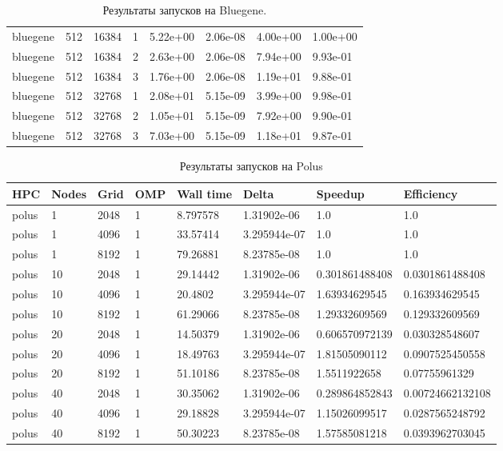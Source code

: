\documentclass[12pt,a4paper]{scrartcl}
\begin{document}
\begin{center}
\begin{table}[h]
\begin{tabular}{l|lllllll}
bluegene & 512 & 16384 & 1 & 5.22e+00 & 2.06e-08 & 4.00e+00 & 1.00e+00 \\
bluegene & 512 & 16384 & 2 & 2.63e+00 & 2.06e-08 & 7.94e+00 & 9.93e-01 \\
bluegene & 512 & 16384 & 3 & 1.76e+00 & 2.06e-08 & 1.19e+01 & 9.88e-01 \\
bluegene & 512 & 32768 & 1 & 2.08e+01 & 5.15e-09 & 3.99e+00 & 9.98e-01 \\
bluegene & 512 & 32768 & 2 & 1.05e+01 & 5.15e-09 & 7.92e+00 & 9.90e-01 \\
bluegene & 512 & 32768 & 3 & 7.03e+00 & 5.15e-09 & 1.18e+01 & 9.87e-01 \\
\hline
\end{tabular}
\caption{Результаты запусков на Bluegene.}
\end{table}
\end{center}

\newpage
      
\begin{center}
\begin{table}[h]
\begin{tabular}{l|lllllll}
\label{tabular:polus}

HPC & Nodes & Grid & OMP & Wall time & Delta & Speedup & Efficiency \\
\hline
polus & 1 & 2048 & 1 & 8.797578 & 1.31902e-06 & 1.0 & 1.0 \\
polus & 1 & 4096 & 1 & 33.57414 & 3.295944e-07 & 1.0 & 1.0 \\
polus & 1 & 8192 & 1 & 79.26881 & 8.23785e-08 & 1.0 & 1.0 \\
polus & 10 & 2048 & 1 & 29.14442 & 1.31902e-06 & 0.301861488408 & 0.0301861488408 \\
polus & 10 & 4096 & 1 & 20.4802 & 3.295944e-07 & 1.63934629545 & 0.163934629545 \\
polus & 10 & 8192 & 1 & 61.29066 & 8.23785e-08 & 1.29332609569 & 0.129332609569 \\
polus & 20 & 2048 & 1 & 14.50379 & 1.31902e-06 & 0.606570972139 & 0.030328548607 \\
polus & 20 & 4096 & 1 & 18.49763 & 3.295944e-07 & 1.81505090112 & 0.0907525450558 \\
polus & 20 & 8192 & 1 & 51.10186 & 8.23785e-08 & 1.5511922658 & 0.07755961329 \\
polus & 40 & 2048 & 1 & 30.35062 & 1.31902e-06 & 0.289864852843 & 0.00724662132108 \\
polus & 40 & 4096 & 1 & 29.18828 & 3.295944e-07 & 1.15026099517 & 0.0287565248792 \\
polus & 40 & 8192 & 1 & 50.30223 & 8.23785e-08 & 1.57585081218 & 0.0393962703045 \\
\hline

\end{tabular}
\caption{Результаты запусков на Polus}
\end{table}
\end{center}
\end{document}
